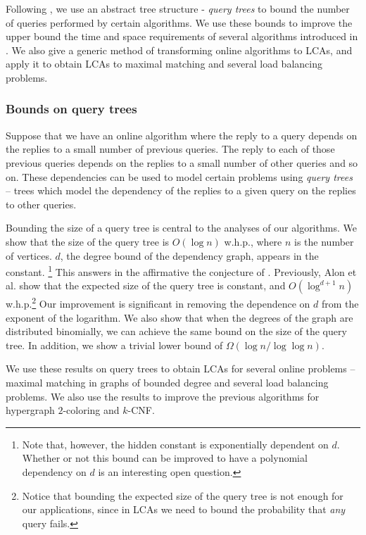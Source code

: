 \documentclass[english, oribibl]{llncs}
\begin{document}
Following  \cite{ARV+11}, we use an abstract tree structure - \emph{query trees} to bound the number of queries performed by certain algorithms. We use these bounds to improve the upper bound the time and space requirements of several algorithms introduced in \cite{ARV+11}. We also give a generic method of transforming online algorithms to LCAs, and apply it to obtain LCAs to maximal matching and several load balancing problems.


\subsubsection{Bounds on query trees}

Suppose that we have an online algorithm where the reply to a query depends
on the replies to a small number of previous queries. The reply to each of those previous queries depends on the replies to a small number of other queries and so on. These dependencies can be used to model certain problems using \emph{query trees} -- trees which model the dependency of the replies to a given query on the replies to other queries. 


Bounding the size of a query tree is central to the analyses of our algorithms.  We show that the size of the query tree is  $O(\log{n})$ w.h.p., where $n$ is the number of vertices. $d$, the degree bound of the dependency graph, appears in the constant. \footnote{Note that, however, the hidden constant is exponentially dependent on $d$. Whether or not this bound can be improved to have a polynomial dependency on $d$ is an interesting open question.} This answers in the affirmative the conjecture of \cite{ARV+11}.
Previously, Alon et al. \cite{ARV+11} show that the expected size of the query tree is constant, and  $O(\log^{d+1}{n})$ w.h.p.\footnote{Notice that bounding the expected size of the query tree is not enough for our applications, since in LCAs we need to bound the probability that \emph{any} query fails.} Our improvement is significant in removing the dependence on $d$ from the exponent of the logarithm. 
 We also show that when the degrees of the graph are distributed binomially, we can achieve the same bound on the size of the query tree. In addition, we show a trivial lower bound of $\Omega(\log{n}/\log{\log{n}})$.
 
We use these results on query trees to obtain LCAs for several online problems -- maximal matching in graphs of bounded degree and several load balancing problems. We also use the results to improve the previous algorithms for hypergraph $2$-coloring and $k$-CNF. 
\end{document}
